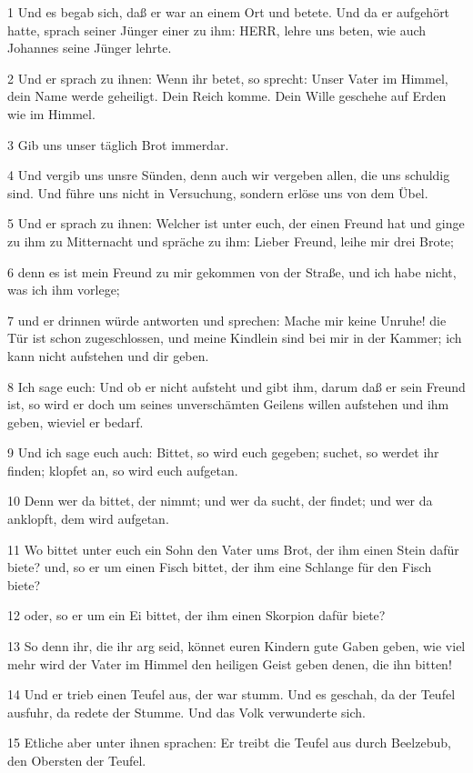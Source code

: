 \par 1 Und es begab sich, daß er war an einem Ort und betete. Und da er aufgehört hatte, sprach seiner Jünger einer zu ihm: HERR, lehre uns beten, wie auch Johannes seine Jünger lehrte.
\par 2 Und er sprach zu ihnen: Wenn ihr betet, so sprecht: Unser Vater im Himmel, dein Name werde geheiligt. Dein Reich komme. Dein Wille geschehe auf Erden wie im Himmel.
\par 3 Gib uns unser täglich Brot immerdar.
\par 4 Und vergib uns unsre Sünden, denn auch wir vergeben allen, die uns schuldig sind. Und führe uns nicht in Versuchung, sondern erlöse uns von dem Übel.
\par 5 Und er sprach zu ihnen: Welcher ist unter euch, der einen Freund hat und ginge zu ihm zu Mitternacht und spräche zu ihm: Lieber Freund, leihe mir drei Brote;
\par 6 denn es ist mein Freund zu mir gekommen von der Straße, und ich habe nicht, was ich ihm vorlege;
\par 7 und er drinnen würde antworten und sprechen: Mache mir keine Unruhe! die Tür ist schon zugeschlossen, und meine Kindlein sind bei mir in der Kammer; ich kann nicht aufstehen und dir geben.
\par 8 Ich sage euch: Und ob er nicht aufsteht und gibt ihm, darum daß er sein Freund ist, so wird er doch um seines unverschämten Geilens willen aufstehen und ihm geben, wieviel er bedarf.
\par 9 Und ich sage euch auch: Bittet, so wird euch gegeben; suchet, so werdet ihr finden; klopfet an, so wird euch aufgetan.
\par 10 Denn wer da bittet, der nimmt; und wer da sucht, der findet; und wer da anklopft, dem wird aufgetan.
\par 11 Wo bittet unter euch ein Sohn den Vater ums Brot, der ihm einen Stein dafür biete? und, so er um einen Fisch bittet, der ihm eine Schlange für den Fisch biete?
\par 12 oder, so er um ein Ei bittet, der ihm einen Skorpion dafür biete?
\par 13 So denn ihr, die ihr arg seid, könnet euren Kindern gute Gaben geben, wie viel mehr wird der Vater im Himmel den heiligen Geist geben denen, die ihn bitten!
\par 14 Und er trieb einen Teufel aus, der war stumm. Und es geschah, da der Teufel ausfuhr, da redete der Stumme. Und das Volk verwunderte sich.
\par 15 Etliche aber unter ihnen sprachen: Er treibt die Teufel aus durch Beelzebub, den Obersten der Teufel.

